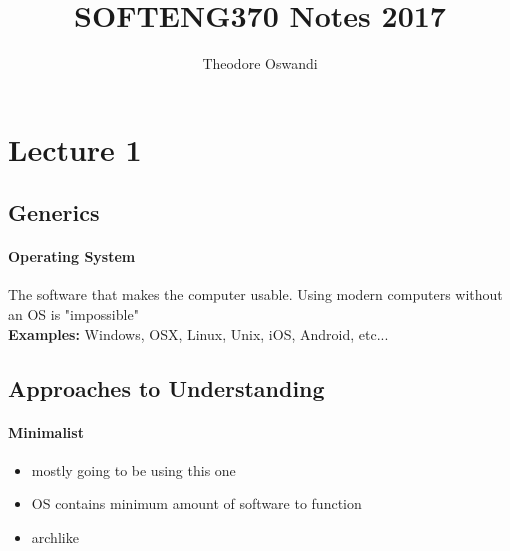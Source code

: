 \documentclass{article}
\title{SOFTENG370 Notes 2017}
\author{Theodore Oswandi}
\newcommand\tab[1][0.5cm]{\hspace*{#1}}
\begin{document}
 \maketitle{} 

\tableofcontents
\newpage

\section{Lecture 1}
	\subsection{Generics}
		\paragraph{\tab Operating System} The software that makes the computer usable. Using modern computers without an OS is "impossible"
			\\ \tab \textbf{Examples: }Windows, OSX, Linux, Unix, iOS, Android, etc...


	\subsection{Approaches to Understanding}
		\paragraph{\tab Minimalist}
		\begin{itemize}
			\item mostly going to be using this one
			\item OS contains minimum amount of software to function
			\item archlike
		\end{itemize}
\end{document}
